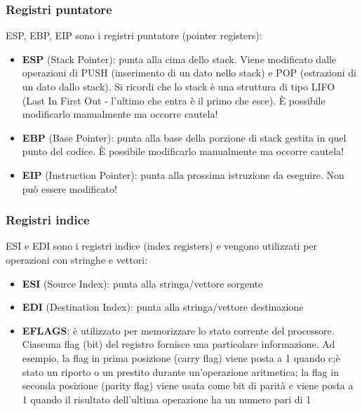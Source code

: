 \documentclass[a4paper]{article}
\theoremstyle{break}
\theoremstyle{break}
\theoremstyle{break}
\theoremstyle{break}
\begin{document}
\subsubsection{Registri puntatore}
ESP, EBP, EIP sono i registri puntatore (pointer registers):
\begin{itemize}
	\item \textbf{ESP} (Stack Pointer):  punta alla cima dello stack. Viene modificato
	      dalle operazioni di PUSH (inserimento di un dato nello stack) e POP
	      (estrazioni di un dato dallo stack). Si ricordi che lo stack è una
	      struttura di tipo LIFO (Last In First Out - l'ultimo che entra è il primo
	      che esce). È possibile modificarlo manualmente ma occorre cautela!
	\item \textbf{EBP} (Base Pointer): punta alla base della porzione di stack gestita in
	      quel punto del codice. È possibile modificarlo manualmente ma
	      occorre cautela!
	\item \textbf{EIP} (Instruction Pointer): punta alla prossima istruzione da eseguire.
	      Non può essere modificato!
\end{itemize}

\subsubsection{Registri indice}
ESI e EDI sono i registri indice (index registers) e vengono utilizzati per
operazioni con stringhe e vettori:
\begin{itemize}
	\item \textbf{ESI} (Source Index):  punta alla stringa/vettore sorgente
	\item \textbf{EDI} (Destination Index): punta alla stringa/vettore destinazione
	\item \textbf{EFLAGS}: è utilizzato per memorizzare lo stato corrente del processore.
	      Ciascuna flag (bit) del registro fornisce una particolare informazione.
	      Ad esempio, la flag in prima posizione (carry flag) viene posta a 1
	      quando c;è stato un riporto o un prestito durante un'operazione
	      aritmetica; la flag in seconda posizione (parity flag) viene usata come
	      bit di parità e viene posta a 1 quando il risultato dell'ultima
	      operazione ha un numero pari di 1
\end{itemize}
\end{document}
